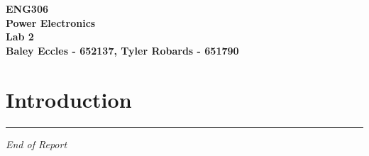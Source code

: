 \documentclass[12pt,a4paper]{article}
\begin{document}
\begin{center}
\textbf{\LARGE ENG306\\[6pt]
Power Electronics}\\[10pt]
\textbf{\large Lab 2\\[4pt]
Baley Eccles - 652137, Tyler Robards - 651790}\\
\end{center}

\section{Introduction}

\vfill
\hrule
\begin{center}
\textit{End of Report}
\end{center}
\end{document}
